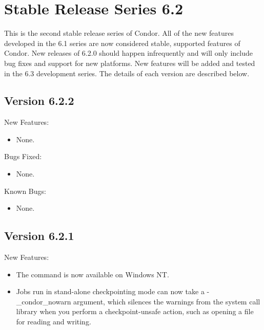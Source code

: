 \section{\label{sec:History-6-2}Stable Release Series 6.2}

This is the second stable release series of Condor.
All of the new features developed in the 6.1 series are now considered
stable, supported features of Condor.
New releases of 6.2.0 should happen infrequently and will only include
bug fixes and support for new platforms.
New features will be added and tested in the 6.3 development series. 
The details of each version are described below.
\subsection{\label{sec:New-6-2-1}Version 6.2.2}
\noindent New Features:
\begin{itemize}
\item None.
\end{itemize}

\noindent Bugs Fixed:
\begin{itemize}
\item None.
\end{itemize}

\noindent Known Bugs:
\begin{itemize}
\item None.
\end{itemize}

\subsection{\label{sec:New-6-2-1}Version 6.2.1}

\noindent New Features:

\begin{itemize}

\item The  command is now available on Windows NT.

\item Jobs run in stand-alone checkpointing mode can now take a -\_condor\_nowarn
argument, which silences the warnings from the system call library when you
perform a checkpoint-unsafe action, such as opening a file for reading and
writing.

\end{itemize}

